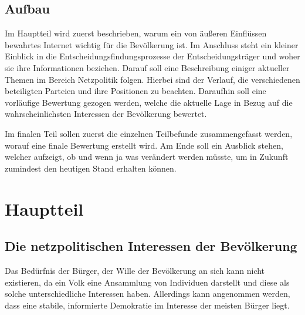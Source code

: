 \documentclass[
	12pt,
	a4paper,
	BCOR10mm,
	DIV14,
	listof=totoc,
	bibliography=totoc,
	headsepline
]{scrreprt}
\begin{document}
\section{Aufbau}
\label{structure}
Im Hauptteil wird zuerst beschrieben, warum ein von äußeren Einflüssen bewahrtes Internet wichtig für die Bevölkerung ist.
Im Anschluss steht ein kleiner Einblick in die Entscheidungsfindungsprozesse der Entscheidungsträger und woher sie ihre Informationen beziehen.
Darauf soll eine Beschreibung einiger aktueller Themen im Bereich Netzpolitik folgen.
Hierbei sind der Verlauf, die verschiedenen beteiligten Parteien und ihre Positionen zu beachten.
Daraufhin soll eine vorläufige Bewertung gezogen werden, welche die aktuelle Lage in Bezug auf die wahrscheinlichsten Interessen der Bevölkerung bewertet. 

Im finalen Teil sollen zuerst die einzelnen Teilbefunde zusammengefasst werden, worauf eine finale Bewertung erstellt wird.
Am Ende soll ein Ausblick stehen, welcher aufzeigt, ob und wenn ja was verändert werden müsste, um in Zukunft zumindest den heutigen Stand erhalten können.


\chapter{Hauptteil}
\label{main}
\section{Die netzpolitischen Interessen der Bevölkerung}
Das Bedürfnis der Bürger, der Wille der Bevölkerung an sich kann nicht existieren, da ein Volk eine Ansammlung von Individuen darstellt und diese als solche unterschiedliche Interessen haben.
Allerdings kann angenommen werden, dass eine stabile, informierte Demokratie im Interesse der meisten Bürger liegt. 
\end{document}
